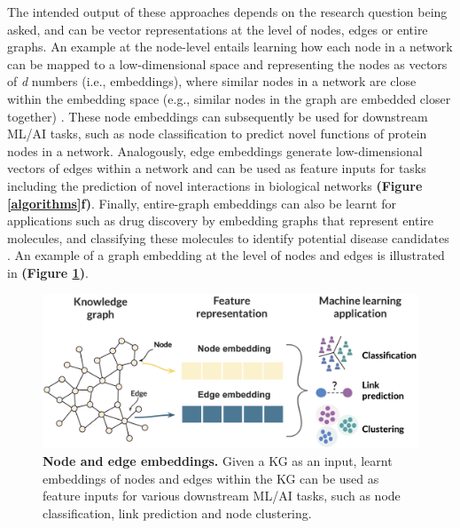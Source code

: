 The intended output of these approaches depends on the research question being asked, and can be vector representations at the level of nodes, edges or entire graphs. An example at the node-level entails learning how each node in a network can be mapped to a low-dimensional space and representing the nodes as vectors of \textit{d} numbers (i.e., embeddings), where similar nodes in a network are close within the embedding space (e.g., similar nodes in the graph are embedded closer together) \parencite{liu2020}. These node embeddings can subsequently be used for downstream ML/AI tasks, such as node classification to predict novel functions of protein nodes in a network. Analogously, edge embeddings generate low-dimensional vectors of edges within a network and can be used as feature inputs for tasks including the prediction of novel interactions in biological networks \textbf{(Figure \ref{algorithms}f)}. Finally, entire-graph embeddings can also be learnt for applications such as drug discovery by embedding graphs that represent entire molecules, and classifying these molecules to identify potential disease candidates \parencite{atz2021}. An example of a graph embedding at the level of nodes and edges is illustrated in \textbf{(Figure \ref{embeddings})}.

{\footnotesize
\begin{figure}[ht]
	\centering
		\includegraphics[width=\linewidth]{figures/embeddings.png}
	\caption{\footnotesize \textbf{Node and edge embeddings.} Given a KG as an input, learnt embeddings of nodes and edges within the KG can be used as feature inputs for various downstream ML/AI tasks, such as node classification, link prediction and node clustering.}

    \label{embeddings}
\end{figure}
}

